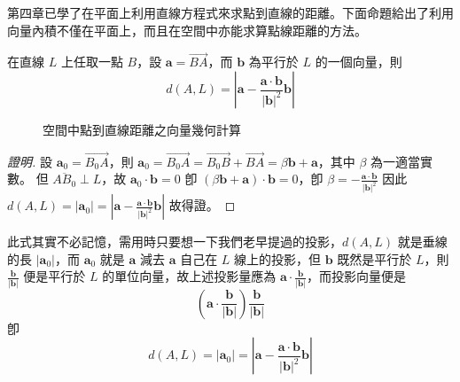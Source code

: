 第四章已學了在平面上利用直線方程式來求點到直線的距離。下面命題給出了利用向量內積不僅在平面上，而且在空間中亦能求算點線距離的方法。

\begin{example}[論例 2]
在直線 $L$ 上任取一點 $B$，設 $\mathbf{a} = \vec{BA}$，而 $\mathbf{b}$ 為平行於 $L$ 的一個向量，則
\[ d(A, L) = \left| \mathbf{a} - \frac{\mathbf{a} \cdot \mathbf{b}}{|\mathbf{b}|^2} \mathbf{b} \right| \]
\end{example}

\begin{figure}[H]
\centering
{}
\caption{空間中點到直線距離之向量幾何計算}
\label{fig:5-7}
\end{figure}

\begin{proof}[證明]
設 $\mathbf{a}_0 = \vec{B_0A}$，則 $\mathbf{a}_0 = \vec{B_0A} = \vec{B_0B} + \vec{BA} = \beta \mathbf{b} + \mathbf{a}$，其中 $\beta$ 為一適當實數。
但 $\overline{AB_0} \perp L$，故 $\mathbf{a}_0 \cdot \mathbf{b} = 0$
卽 $(\beta \mathbf{b} + \mathbf{a}) \cdot \mathbf{b} = 0$，卽 $\beta = -\frac{\mathbf{a} \cdot \mathbf{b}}{|\mathbf{b}|^2}$
因此 $d(A, L) = |\mathbf{a}_0| = \left| \mathbf{a} - \frac{\mathbf{a} \cdot \mathbf{b}}{|\mathbf{b}|^2} \mathbf{b} \right|$ 故得證。
\end{proof}

此式其實不必記憶，需用時只要想一下我們老早提過的投影，$d(A, L)$ 就是垂線的長 $|\mathbf{a}_0|$，而 $\mathbf{a}_0$ 就是 $\mathbf{a}$ 減去 $\mathbf{a}$ 自己在 $L$ 線上的投影，但 $\mathbf{b}$ 既然是平行於 $L$，則 $\frac{\mathbf{b}}{|\mathbf{b}|}$ 便是平行於 $L$ 的單位向量，故上述投影量應為 $\mathbf{a} \cdot \frac{\mathbf{b}}{|\mathbf{b}|}$，而投影向量便是
\[ \left( \mathbf{a} \cdot \frac{\mathbf{b}}{|\mathbf{b}|} \right) \frac{\mathbf{b}}{|\mathbf{b}|} \]
卽
\[ d(A, L) = |\mathbf{a}_0| = \left| \mathbf{a} - \frac{\mathbf{a} \cdot \mathbf{b}}{|\mathbf{b}|^2} \mathbf{b} \right| \]

